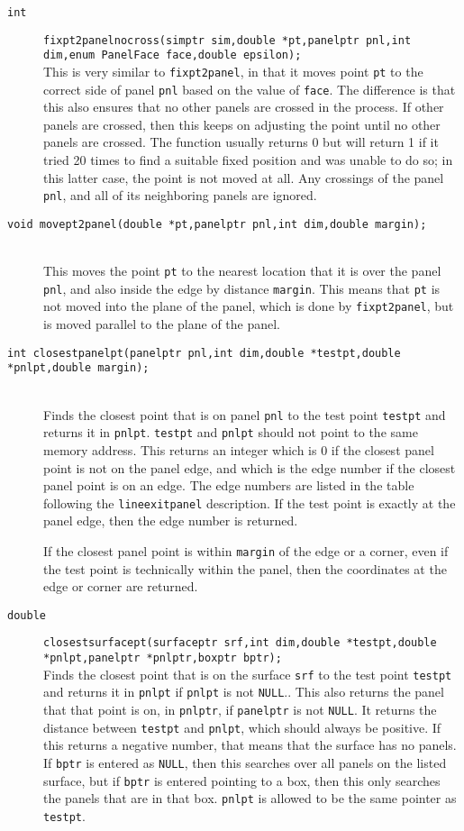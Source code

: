 \documentclass {book}
\newcommand {\ttt} {\texttt}
\begin{document}
\begin{description}
\item[\ttt{int}]
\ttt{fixpt2panelnocross(simptr sim,double *pt,panelptr pnl,int dim,enum PanelFace face,double epsilon);}
\hfill \\
This is very similar to \ttt{fixpt2panel}, in that it moves point \ttt{pt} to the correct side of panel \ttt{pnl} based on the value of \ttt{face}. The difference is that this also ensures that no other panels are crossed in the process. If other panels are crossed, then this keeps on adjusting the point until no other panels are crossed. The function usually returns 0 but will return 1 if it tried 20 times to find a suitable fixed position and was unable to do so; in this latter case, the point is not moved at all. Any crossings of the panel \ttt{pnl}, and all of its neighboring panels are ignored.

\item[\ttt{void movept2panel(double *pt,panelptr pnl,int dim,double margin);}]
\hfill \\
This moves the point \ttt{pt} to the nearest location that it is over the panel \ttt{pnl}, and also inside the edge by distance \ttt{margin}. This means that \ttt{pt} is not moved into the plane of the panel, which is done by \ttt{fixpt2panel}, but is moved parallel to the plane of the panel.

\item[\ttt{int closestpanelpt(panelptr pnl,int dim,double *testpt,double *pnlpt,double margin);}]
\hfill \\
Finds the closest point that is on panel \ttt{pnl} to the test point \ttt{testpt} and returns it in \ttt{pnlpt}. \ttt{testpt} and \ttt{pnlpt} should not point to the same memory address. This returns an integer which is 0 if the closest panel point is not on the panel edge, and which is the edge number if the closest panel point is on an edge. The edge numbers are listed in the table following the \ttt{lineexitpanel} description. If the test point is exactly at the panel edge, then the edge number is returned.

If the closest panel point is within \ttt{margin} of the edge or a corner, even if the test point is technically within the panel, then the coordinates at the edge or corner are returned.

\item[\ttt{double}]
\ttt{closestsurfacept(surfaceptr srf,int dim,double *testpt,double *pnlpt,panelptr *pnlptr,boxptr bptr);}
\hfill \\
Finds the closest point that is on the surface \ttt{srf} to the test point \ttt{testpt} and returns it in \ttt{pnlpt} if \ttt{pnlpt} is not \ttt{NULL}.. This also returns the panel that that point is on, in \ttt{pnlptr}, if \ttt{panelptr} is not \ttt{NULL}. It returns the distance between \ttt{testpt} and \ttt{pnlpt}, which should always be positive. If this returns a negative number, that means that the surface has no panels. If \ttt{bptr} is entered as \ttt{NULL}, then this searches over all panels on the listed surface, but if \ttt{bptr} is entered pointing to a box, then this only searches the panels that are in that box. \ttt{pnlpt} is allowed to be the same pointer as \ttt{testpt}.


\end{description}
\end{document}
